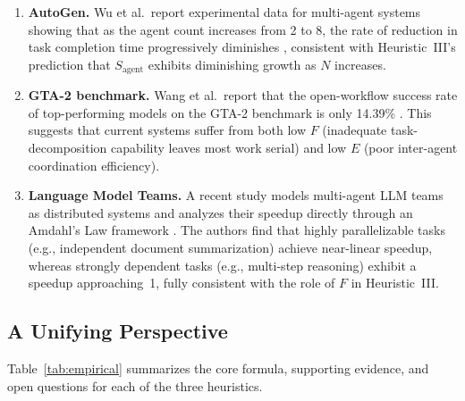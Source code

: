 \begin{enumerate}[nosep]
\item \textbf{AutoGen.} Wu et al.\ report experimental data for multi-agent systems showing that as the agent count increases from 2 to 8, the rate of reduction in task completion time progressively diminishes \cite{wu2023autogen}, consistent with Heuristic~III's prediction that $S_{\mathrm{agent}}$ exhibits diminishing growth as $N$ increases.

\item \textbf{GTA-2 benchmark.} Wang et al.\ report that the open-workflow success rate of top-performing models on the GTA-2 benchmark is only 14.39\% \cite{gta2_2025}. This suggests that current systems suffer from both low $F$ (inadequate task-decomposition capability leaves most work serial) and low $E$ (poor inter-agent coordination efficiency).

\item \textbf{Language Model Teams.} A recent study models multi-agent LLM teams as distributed systems and analyzes their speedup directly through an Amdahl's Law framework \cite{langmodelteams2026}. The authors find that highly parallelizable tasks (e.g., independent document summarization) achieve near-linear speedup, whereas strongly dependent tasks (e.g., multi-step reasoning) exhibit a speedup approaching~1, fully consistent with the role of $F$ in Heuristic~III.
\end{enumerate}

\subsection{A Unifying Perspective}
\label{sec:laws-summary}

Table~\ref{tab:empirical} summarizes the core formula, supporting evidence, and open questions for each of the three heuristics.

